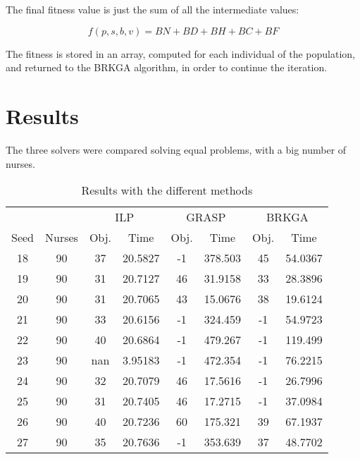 \documentclass[12pt,a4paper]{article}
\begin{document}
The final fitness value is just the sum of all the intermediate values:

$$ f(p,s,b,v) = BN + BD + BH + BC + BF $$

The fitness is stored in an array, computed for each individual of the
population, and returned to the BRKGA algorithm, in order to continue the
iteration.

\section{Results}

The three solvers were compared solving equal problems, with a big number of
nurses.

\begin{table}[h]
\centering
\begin{tabular}{cccccccc}
\toprule
       &          &\multicolumn{2}{c}{ILP} & \multicolumn{2}{c}{GRASP} & \multicolumn{2}{c}{BRKGA} \\
Seed   &  Nurses  & Obj. & Time & Obj. & Time & Obj. & Time \\
\midrule
    18 &     90   &     37   & 20.5827    &       -1  &  378.503   &        45  &   54.0367 \\
    19 &     90   &     31   & 20.7127    &       46  &   31.9158  &        33  &   28.3896 \\
    20 &     90   &     31   & 20.7065    &       43  &   15.0676  &        38  &   19.6124 \\
    21 &     90   &     33   & 20.6156    &       -1  &  324.459   &        -1  &   54.9723 \\
    22 &     90   &     40   & 20.6864    &       -1  &  479.267   &        -1  &   119.499 \\
    23 &     90   &    nan   & 3.95183    &      -1   &  472.354   &        -1  &   76.2215 \\
    24 &     90   &     32   & 20.7079    &       46  &  17.5616   &       -1   &   26.7996 \\
    25 &     90   &     31   & 20.7405    &       46  &  17.2715   &       -1   &   37.0984 \\
    26 &     90   &     40   & 20.7236    &       60  & 175.321    &       39   &   67.1937 \\
    27 &     90   &     35   & 20.7636    &       -1  & 353.639    &       37   &   48.7702 \\
\bottomrule
\end{tabular}
\caption{Results with the different methods}
\label{tab:res}
\end{table}
\end{document}
